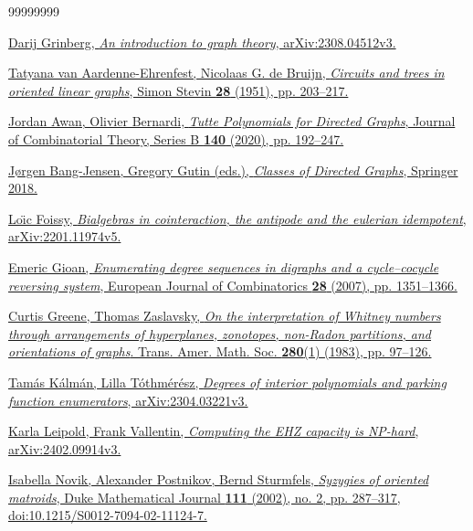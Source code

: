 \documentclass[numbers=enddot,12pt,final,onecolumn,notitlepage]{scrartcl}%
\theoremstyle{definition}
\theoremstyle{plainsl}
\begin{document}
\begin{thebibliography}{99999999}                                                                                         %


\href{https://arxiv.org/abs/2308.04512v3}{Darij Grinberg,
\textit{An introduction to graph theory}, arXiv:2308.04512v3.}

\href{https://pure.tue.nl/ws/files/3311129/597493.pdf}{%
Tatyana van Aardenne-Ehrenfest, Nicolaas G. de Bruijn,
\textit{Circuits and trees in oriented linear graphs},
Simon Stevin \textbf{28} (1951), pp. 203--217.}

%
\href{https://doi.org/10.1016/j.jctb.2019.05.006}{Jordan Awan, Olivier
Bernardi, \textit{Tutte Polynomials for Directed Graphs}, Journal of
Combinatorial Theory, Series B \textbf{140} (2020), pp. 192--247.}

%
\href{https://doi.org/10.1007/978-3-319-71840-8}{J\o rgen Bang-Jensen, Gregory
Gutin (eds.), \textit{Classes of Directed Graphs}, Springer 2018.}

%
\href{https://arxiv.org/abs/2201.11974v5}{Lo\"{\i}c Foissy, \textit{Bialgebras
in cointeraction, the antipode and the eulerian idempotent},
arXiv:2201.11974v5.}

%
\href{http://dx.doi.org/10.1016/j.ejc.2005.11.006}{Emeric Gioan,
\textit{Enumerating degree sequences in digraphs and a cycle--cocycle
reversing system}, European Journal of Combinatorics \textbf{28} (2007), pp.
1351--1366.}

%
\href{https://doi.org/10.1090/S0002-9947-1983-0712251-1}{Curtis Greene, Thomas
Zaslavsky, \textit{On the interpretation of Whitney numbers through
arrangements of hyperplanes, zonotopes, non-Radon partitions, and orientations
of graphs}. Trans. Amer. Math. Soc. \textbf{280}(1) (1983), pp. 97--126.}

%
\href{https://arxiv.org/abs/2304.03221v3}{Tam\'{a}s K\'{a}lm\'{a}n, Lilla
T\'{o}thm\'{e}r\'{e}sz, \textit{Degrees of interior polynomials and parking
function enumerators}, arXiv:2304.03221v3.}

\href{https://arxiv.org/abs/2402.09914v3}{Karla
Leipold, Frank Vallentin, \textit{Computing the EHZ capacity is NP-hard},
arXiv:2402.09914v3.}

%
\href{https://math.mit.edu/~apost/papers/syzygies_matroids_journal.pdf}{Isabella
Novik, Alexander Postnikov, Bernd Sturmfels, \textit{Syzygies of oriented
matroids}, Duke Mathematical Journal \textbf{111} (2002), no. 2, pp. 287--317,
doi:10.1215/S0012-7094-02-11124-7.}


\end{thebibliography}
\end{document}
